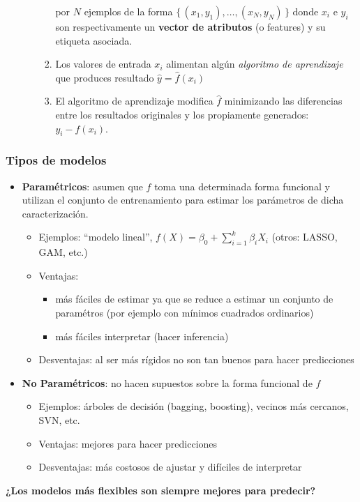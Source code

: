 \documentclass[leqno, 10pt, envcountsect]{beamer}
\numberwithin{equation}{section}
\theoremstyle{definition}
\theoremstyle{example}
\numberwithin{figure}{section}
\numberwithin{table}{section}
\let\olditem\item
\renewcommand{\item}{%
\olditem\vspace{1pt}}
\begin{document}
\begin{frame}
\begin{itemize}
\begin{itemize}
\begin{enumerate}
              por $N$ ejemplos de la forma $\{\, (x_{1}, y_{1}), \ldots, (x_{N},
              y_{N}) \,\}$ donde $x_{i}$ e $y_{i}$ son respectivamente un
              \textbf{vector de atributos} (o features) y su etiqueta asociada.
            \item Los valores de entrada $x_{i}$ alimentan algún
              \textit{algoritmo de aprendizaje} que produces resultado $\hat{y}
              = \hat{f}(x_{i})$
            \item El algoritmo de aprendizaje modifica $\hat{f}$ minimizando las
              diferencias entre los resultados originales y los propiamente
              generados: $y_{i} - \hat{f}(x_{i})$.
          \end{enumerate}
      \end{itemize}
  \end{itemize}
\end{frame}
\begin{frame}
  \frametitle{Tipos de modelos}
  \begin{itemize}
    \item \textbf{Paramétricos}: asumen que $f$ toma una determinada forma
      funcional y utilizan el conjunto de entrenamiento para estimar los
      parámetros de dicha caracterización.
      \begin{itemize}
        \item Ejemplos: \enquote{modelo lineal},  $f(X) = \beta_{0} +
          \sum_{i=1}^{k}\beta_{i}{X}_{i}$ (otros: LASSO, GAM, etc.)
        \item Ventajas:
      \begin{itemize}
        \item más fáciles de estimar ya que se reduce a estimar un
          conjunto de paramétros (por ejemplo con mínimos cuadrados ordinarios)
        \item más fáciles interpretar (hacer inferencia)
      \end{itemize}
        \item Desventajas: al ser más rígidos no son tan buenos para hacer
          predicciones
      \end{itemize}
    \item \textbf{No Paramétricos}: no hacen supuestos sobre la forma funcional de $f$
      \begin{itemize}
        \item Ejemplos: árboles de decisión (bagging, boosting), vecinos más
          cercanos, SVN, etc.
        \item Ventajas: mejores para hacer predicciones
        \item Desventajas: más costosos de ajustar y difíciles de interpretar
      \end{itemize}
  \end{itemize}

  \textbf{¿Los modelos más flexibles son siempre mejores para predecir?}
\end{frame}
\end{document}
